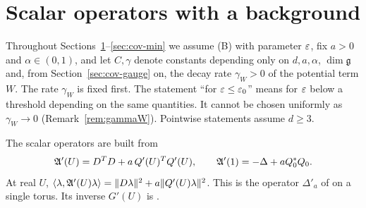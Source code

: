 \section{Scalar operators with a background}\label{sec:cov-scalar}

Throughout Sections~\ref{sec:cov-scalar}--\ref{sec:cov-min} we assume (B) with parameter $\varepsilon$, fix $a>0$ and $\alpha\in(0,1)$, and let $C,\gamma$ denote constants depending only on $d,a,\alpha$, $\dim\mathfrak g$ and, from Section~\ref{sec:cov-gauge} on, the decay rate $\gamma_W>0$ of the potential term $W$. The rate $\gamma_W$ is fixed first. The statement ``for $\varepsilon\le\varepsilon_0$'' means for $\varepsilon$ below a threshold depending on the same quantities. It cannot be chosen uniformly as $\gamma_W\to0$ (Remark~\ref{rem:gammaW}). Pointwise statements assume $d\ge3$.

The scalar operators are built from
\[
\mathfrak A'(U)=D^TD+a\,Q'(U)^TQ'(U),\qquad \mathfrak A'(1)=-\Delta+aQ_0^*Q_0 .
\]
At real $U$, $\langle \lambda,\mathfrak A'(U)\lambda\rangle=\|D\lambda\|^2+a\|Q'(U)\lambda\|^2$. This is the operator $\Delta'_a$ of \cite[(3.24)]{BalBackground} on a single torus. Its inverse $G'(U)$ is \cite[$G'$, (3.25)]{BalBackground}.

